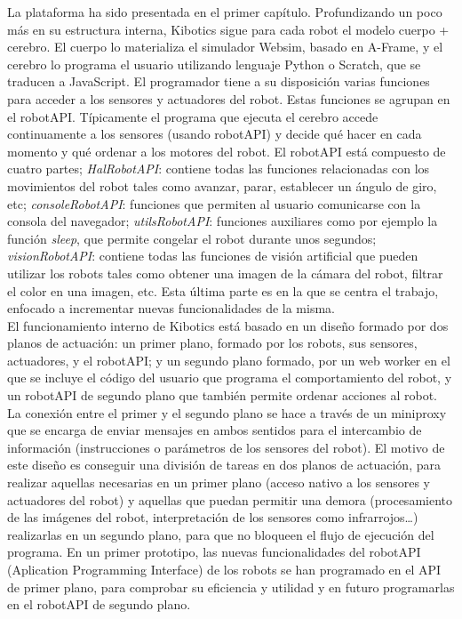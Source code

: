 \documentclass{report}
\begin{document}
La plataforma ha sido presentada en el primer capítulo. Profundizando un poco más en su estructura interna, Kibotics sigue para cada robot el modelo cuerpo + cerebro. El cuerpo lo materializa el simulador Websim, basado en A-Frame, y el cerebro lo programa el usuario utilizando lenguaje Python o Scratch, que se traducen a JavaScript. El programador tiene a su disposición varias funciones para acceder a los sensores y actuadores del robot. Estas funciones se agrupan en el robotAPI. Típicamente el programa que ejecuta el cerebro accede continuamente a los sensores (usando robotAPI) y decide qué hacer en cada momento y qué ordenar a los motores del robot. El robotAPI está compuesto de cuatro partes; \textit{HalRobotAPI}: contiene todas las funciones relacionadas con los movimientos del robot tales como avanzar, parar, establecer un ángulo de giro, etc; \textit{consoleRobotAPI}: funciones que permiten al usuario comunicarse con la consola del navegador; \textit{utilsRobotAPI}: funciones auxiliares como por ejemplo la función \textit{sleep}, que permite congelar el robot durante unos segundos; \textit{visionRobotAPI}: contiene todas las funciones de visión artificial que pueden utilizar los robots tales como obtener una imagen de la cámara del robot, filtrar el color en una imagen, etc. Esta última parte es en la que se centra el trabajo, enfocado a incrementar nuevas funcionalidades de la misma.
\\

El funcionamiento interno de Kibotics está basado en un diseño formado por dos planos de actuación: un primer plano, formado por los robots, sus sensores, actuadores, y el robotAPI; y un segundo plano formado, por un web worker en el que se incluye el código del usuario que programa el comportamiento del robot, y un robotAPI de segundo plano que también permite ordenar acciones al robot. La conexión entre el primer y el segundo plano se hace a través de un miniproxy que se encarga de enviar mensajes en ambos sentidos para el intercambio de información (instrucciones o parámetros de los sensores del robot). El motivo de este diseño es conseguir una división de tareas en dos planos de actuación, para realizar aquellas necesarias en un primer plano (acceso nativo a los sensores y actuadores del robot) y aquellas que puedan permitir una demora (procesamiento de las imágenes del robot, interpretación de los sensores como infrarrojos…) realizarlas en un segundo plano, para que no bloqueen el flujo de ejecución del programa. En un primer prototipo, las nuevas funcionalidades del robotAPI  (Aplication Programming Interface) de los robots se han programado en el API de primer plano, para comprobar su eficiencia y utilidad y en futuro programarlas en el robotAPI de segundo plano.
\end{document}
